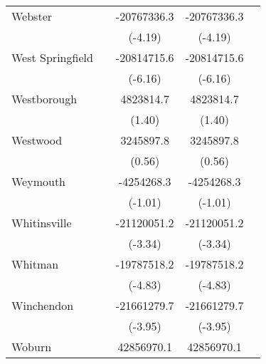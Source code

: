 {\begin{tabular}{l*{4}{c}}
\addlinespace
Webster             &                     & -20767336.3\sym{***}& -20767336.3\sym{***}&                     \\
                    &                     &     (-4.19)         &     (-4.19)         &                     \\
\addlinespace
West Springfield    &                     & -20814715.6\sym{***}& -20814715.6\sym{***}&                     \\
                    &                     &     (-6.16)         &     (-6.16)         &                     \\
\addlinespace
Westborough         &                     &   4823814.7         &   4823814.7         &                     \\
                    &                     &      (1.40)         &      (1.40)         &                     \\
\addlinespace
Westwood            &                     &   3245897.8         &   3245897.8         &                     \\
                    &                     &      (0.56)         &      (0.56)         &                     \\
\addlinespace
Weymouth            &                     &  -4254268.3         &  -4254268.3         &                     \\
                    &                     &     (-1.01)         &     (-1.01)         &                     \\
\addlinespace
Whitinsville        &                     & -21120051.2\sym{***}& -21120051.2\sym{***}&                     \\
                    &                     &     (-3.34)         &     (-3.34)         &                     \\
\addlinespace
Whitman             &                     & -19787518.2\sym{***}& -19787518.2\sym{***}&                     \\
                    &                     &     (-4.83)         &     (-4.83)         &                     \\
\addlinespace
Winchendon          &                     & -21661279.7\sym{***}& -21661279.7\sym{***}&                     \\
                    &                     &     (-3.95)         &     (-3.95)         &                     \\
\addlinespace
Woburn              &                     &  42856970.1\sym{***}&  42856970.1\sym{***}&                     \\

\end{tabular}}
